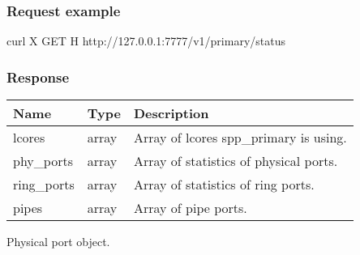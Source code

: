 \documentclass[a4paper,11pt,openany,oneside,english]{sphinxmanual}
\begin{document}
\subsubsection{Request example}
\label{\detokenize{api_ref/spp_primary:request-example}}
\begin{sphinxVerbatim}[commandchars=\\\{\},formatcom=\footnotesize]
 curl \PYGZhy{}X GET \PYGZhy{}H  
  http://127.0.0.1:7777/v1/primary/status
\end{sphinxVerbatim}


\subsubsection{Response}
\label{\detokenize{api_ref/spp_primary:response}}

\begin{savenotes}\sphinxattablestart
\centering
{}
\sphinxthecaptionisattop
{}\label{\detokenize{api_ref/spp_primary:id33}}\label{\detokenize{api_ref/spp_primary:table-spp-ctl-primary-status}}
\sphinxaftertopcaption
\begin{tabulary}{\linewidth}[t]{|T|T|T|}
\hline
\sphinxstyletheadfamily 
Name
&\sphinxstyletheadfamily 
Type
&\sphinxstyletheadfamily 
Description
\\
\hline
lcores
&
array
&
Array of lcores spp\_primary is using.
\\
\hline
phy\_ports
&
array
&
Array of statistics of physical ports.
\\
\hline
ring\_ports
&
array
&
Array of statistics of ring ports.
\\
\hline
pipes
&
array
&
Array of pipe ports.
\\
\hline
\end{tabulary}
\par
\sphinxattableend\end{savenotes}

Physical port object.
\end{document}
